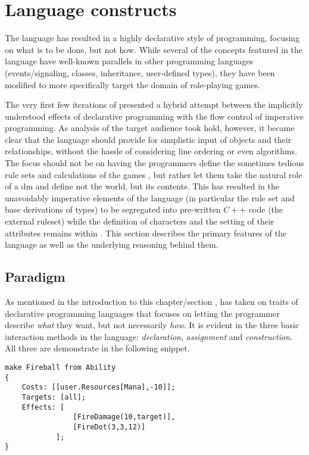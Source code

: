 \section{Language constructs}
The \langname language has resulted in a highly declarative style of programming, focusing on what is to be done, but not how. While several of the concepts featured in the language have well-known parallels in other programming languages (events/signaling, classes, inheritance, user-defined types), they have been modified to more specifically target the domain of role-playing games.

The very first few iterations of \langname{} presented a hybrid attempt between the implicitly understood effects of declarative programming with the flow control of imperative programming. As analysis of the target audience took hold, however, it became clear that the language should provide for simplistic input of objects  and their relationships, without the hassle of considering line ordering or even algorithms. The focus should not be on having the programmers define the sometimes tedious rule sets and calculations of the games , but rather let them take the natural role of a \ac{dm} and define not the world, but its contents. This has resulted in the unavoidably imperative elements of the language (in particular the rule set and base derivations of types) to be segregated into pre-written $C++$ code (the external ruleset) while the definition of characters and the setting of their attributes remains within \langname{}. This section  describes the primary features of the \langname{} language as well as the underlying reasoning behind them.

\subsection{Paradigm}
\label{sec:language:paradigm}
As mentioned in the introduction to this chapter/section , \langname{} has taken on traits of declarative programming languages that focuses on letting the programmer describe \emph{what} they want, but not necessarily \emph{how}. It is evident in the three basic interaction methods in the language: \emph{declaration}, \emph{assignment} and \emph{construction}. All three are demonstrate in the following snippet. 

\begin{lstlisting}[language=fflang]
make Fireball from Ability
{
	Costs: [[user.Resources[Mana],-10]];
	Targets: [all];
	Effects: [
				[FireDamage(10,target)],
				[FireDot(3,3,12)]
			];
}
\end{lstlisting}

